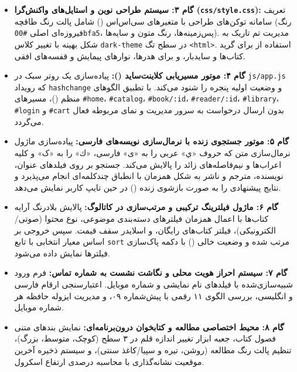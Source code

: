 \documentclass[12pt]{exam}
\begin{document}
\begin{questions}
\begin{itemize}
    \item \textbf{گام ۳: سیستم طراحی نوین و استایل‌های واکنش‌گرا (\texttt{css/style.css}):}
    تعریف سامانه توکن‌های طراحی با متغیرهای سی‌اس‌اس () شامل پالت رنگ طاقچه (رنگ فیروزه‌ای اصلی \texttt{\#00bfa5}، پس‌زمینه‌ها، رنگ متون و سایه‌ها). مدیریت تم تاریک به شکل بهینه با تغییر کلاس \texttt{dark-theme} در سطح تگ \texttt{<html>}. استفاده از  برای گرید کتاب‌ها و سایدبار، و  برای هدرها، نوارهای پیمایش و قفسه‌های افقی.

    \item \textbf{گام ۴: موتور مسیریابی کلاینت‌ساید ():}
    پیاده‌سازی یک روتر سبک در \texttt{js/app.js} که رویداد \texttt{hashchange} و وضعیت اولیه پنجره را شنود می‌کند. با تطبیق الگوهای منظم ()، مسیرهای \texttt{\#home}، \texttt{\#catalog}، \texttt{\#book/:id}، \texttt{\#reader/:id}، \texttt{\#library}، \texttt{\#login} و \texttt{\#cart} بدون ارسال درخواست به سرور مدیریت و نمای مربوطه فعال می‌گردد.

    \item \textbf{گام ۵: موتور جستجوی زنده با نرمال‌سازی نویسه‌های فارسی:}
    پیاده‌سازی ماژول نرمال‌سازی متن که حروف «ي» عربی را به «ی» فارسی، «ك» را به «ک» و کلیه اعراب‌ها و نیم‌فاصله‌های زائد را پالایش می‌کند. جستجو بر روی فیلدهای عنوان، نویسنده، مترجم و ناشر به شکل همزمان با انطباق چندکلمه‌ای انجام می‌پذیرد و نتایج پیشنهادی را به صورت بازشوی زنده () در حین تایپ کاربر نمایش می‌دهد.

    \item \textbf{گام ۶: ماژول فیلترینگ ترکیبی و مرتب‌سازی در کاتالوگ:}
    پالایش بلادرنگ آرایه کتاب‌ها با اعمال همزمان فیلترهای دسته‌بندی موضوعی، نوع محتوا (صوتی/الکترونیکی)، فیلتر کتاب‌های رایگان، و اسلایدر سقف قیمت. سپس خروجی بر اساس معیار انتخابی با تابع \texttt{sort} مرتب شده و وضعیت خالی () با دکمه پاک‌سازی فیلترها نمایش داده می‌شود.

    \item \textbf{گام ۷: سیستم احراز هویت محلی و نگاشت نشست به شماره تماس:}
    فرم ورود شبیه‌سازی‌شده با فیلدهای نام نمایشی و شماره موبایل. اعتبارسنجی ارقام فارسی و انگلیسی، بررسی الگوی ۱۱ رقمی با پیش‌شماره ۰۹، و مدیریت ایزوله حافظه هر شماره موبایل.

    \item \textbf{گام ۸: محیط اختصاصی مطالعه و کتابخوان درون‌برنامه‌ای:}
    نمایش بندهای متنی فصول کتاب، جعبه ابزار تغییر اندازه قلم در ۳ سطح (کوچک، متوسط، بزرگ)، تنظیم پالت رنگ مطالعه (روشن، تیره و سپیا/کاغذ سنتی)، و سیستم ذخیره آخرین موقعیت نشانه‌گذاری با محاسبه درصدی ارتفاع اسکرول.
\end{itemize}




\end{questions}
\end{document}
